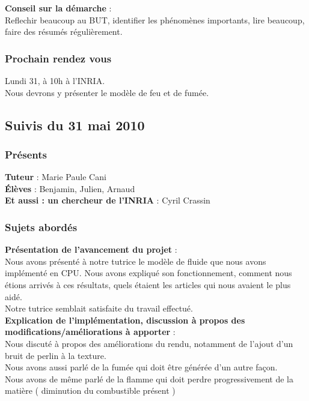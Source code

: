 \documentclass[a4paper,10pt]{article}
\begin{document}
\textbf{Conseil sur la démarche} : \\
Reflechir beaucoup au BUT,
identifier les phénomènes importants,
lire beaucoup,
faire des résumés régulièrement.\\

\subsubsection{Prochain rendez vous}
Lundi 31, à 10h à l'INRIA.\\
Nous devrons y présenter le modèle de feu et de fumée.



\subsection{Suivis du  31 mai 2010}
\subsubsection{Présents}
\textbf{Tuteur} : Marie Paule Cani\\
\textbf{Élèves} : Benjamin, Julien, Arnaud \\
\textbf{Et aussi : un chercheur de l'INRIA} : Cyril Crassin \\

\subsubsection{Sujets abordés}
\textbf{Présentation de l'avancement du projet} :  \\
    Nous avons présenté à notre tutrice le modèle de fluide que nous avons implémenté en CPU.
    Nous avons expliqué son fonctionnement, comment nous étions arrivés à ces résultats, 
    quels étaient les articles qui nous avaient le plus aidé.\\
    Notre tutrice semblait satisfaite du travail effectué.\\
    
\textbf{Explication de l'implémentation, discussion à propos des modifications/améliorations à apporter} :  \\
    Nous discuté à propos des améliorations du rendu, notamment de l'ajout d'un bruit de perlin à la texture.\\
    Nous avons aussi parlé de la fumée qui doit être générée d'un autre façon.\\
    Nous avons de même parlé de la flamme qui doit perdre progressivement de la matière ( diminution du combustible présent )\\
    
\end{document}
